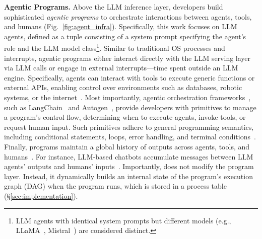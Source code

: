 \noindent \textbf{Agentic Programs.}
Above the LLM inference layer, developers build sophisticated \textit{agentic programs} to orchestrate interactions between agents, tools, and humans (Fig.~\ref{fig:agent_infra}). 
Specifically, this work focuses on LLM agents, defined as a tuple consisting of a system prompt specifying the agent's role and the LLM model class\footnote{LLM agents with identical system prompts but different models (e.g., LLaMA~\cite{llama}, Mistral~\cite{mistral}) are considered distinct\cite{mixtureofagents}.}. Similar to traditional OS processes and interrupts, agentic programs either interact directly with the LLM serving layer via LLM calls or engage in external interrupts—time spent outside an LLM engine. Specifically, agents can interact with tools to execute generic functions or external APIs, enabling control over environments such as databases, robotic systems, or the internet~\cite{schick2023toolformerlanguagemodelsteach, patil2023gorillalargelanguagemodel, yao2023webshopscalablerealworldweb,digirl,lmrobots,zhou2024llmenhanceddatamanagement}. Most importantly, agentic orchestration frameworks~\cite{openai_swarm}, such as LangChain~\cite{langchain, langgraph} and Autogen~\cite{wu2023autogenenablingnextgenllm}, provide developers with primitives to manage a program's control flow, determining when to execute agents, invoke tools, or request human input. Such primitives adhere to general programming semantics, including conditional statements, loops, error handling, and terminal conditions~\cite{zheng2024sglangefficientexecutionstructured, langgraph, wu2023autogenenablingnextgenllm, dspy}.
Finally, programs maintain a global history of outputs across agents, tools, and humans~\cite{lin2024parrotefficientservingllmbased,langgraph,memgpt,bufferofthoughts}. For instance, LLM-based chatbots accumulate messages between LLM agents' outputs and humans' inputs~\cite{openai2023gpt4}. Importantly, \text{\name} does not modify the program layer. Instead, it dynamically builds an internal state of the program’s execution graph (DAG) when the program runs, which is stored in a process table (\S\ref{sec:implementation}).


